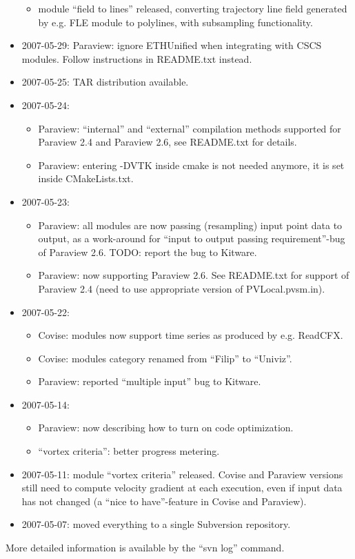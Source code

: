 \begin{itemize}
\begin{itemize}
  \item
    module ``field to lines'' released, converting trajectory line field generated by e.g. FLE module to polylines, with subsampling functionality.
  \end{itemize}

\item
  2007-05-29: Paraview: ignore ETHUnified when integrating with CSCS modules. Follow instructions in README.txt instead.

\item
  2007-05-25: TAR distribution available.

\item
  2007-05-24:
  \begin{itemize}
  \item
  Paraview: ``internal'' and ``external'' compilation methods supported for Paraview 2.4 and Paraview 2.6, see README.txt for details.
  \item
  Paraview: entering -DVTK inside cmake is not needed anymore, it is set inside CMakeLists.txt.
  \end{itemize}

\item
  2007-05-23:
  \begin{itemize}
  \item
    Paraview: all modules are now passing (resampling) input point data to output, as a work-around for ``input to output passing requirement''-bug of Paraview 2.6. TODO: report the bug to Kitware.
  \item
    Paraview: now supporting Paraview 2.6. See README.txt for support of Paraview 2.4 (need to use appropriate version of PVLocal.pvsm.in).
  \end{itemize}

\item
  2007-05-22:
  \begin{itemize}
  \item
    Covise: modules now support time series as produced by e.g. ReadCFX.
  \item
    Covise: modules category renamed from ``Filip'' to ``Univiz''.
  \item
    Paraview: reported ``multiple input'' bug to Kitware.
  \end{itemize}

\item
  2007-05-14:
  \begin{itemize}
  \item
    Paraview: now describing how to turn on code optimization.
  \item
    ``vortex criteria'': better progress metering.
  \end{itemize}

\item
  2007-05-11: module ``vortex criteria'' released. Covise and Paraview versions still need to compute velocity gradient at each execution, even if input data has not changed (a ``nice to have''-feature in Covise and Paraview).

\item
  2007-05-07: moved everything to a single Subversion repository.

\end{itemize}

More detailed information is available by the ``svn log'' command.
